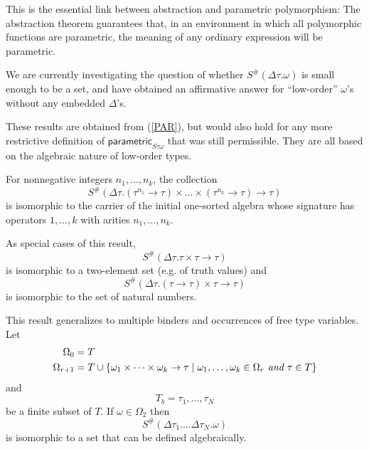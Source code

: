 \documentclass[sigplan,screen,nonacm,balance=false]{acmart}
\makeatletter
\theoremstyle{plain}
\DeclarePairedDelimiter{\set}{\{}{\}}
\newcommand{\eg}{e.g.\@\xspace}
\newcommand{\para}{\mathsf{parametric}}
\makeatother
\begin{document}
This is the essential link between abstraction and parametric polymorphism:
The abstraction theorem guarantees that, in an environment in which all polymorphic functions are parametric, the meaning of any ordinary expression will be parametric.

We are currently investigating the question of whether $S^\#(\Delta \tau. \omega)$ is small enough to be a set, and have obtained an affirmative answer for ``low-order'' $\omega$'s without any embedded $\Delta$'s.

These results are obtained from (\ref{PAR}), but would also hold for any more restrictive definition of $\para_{S \tau \omega}$ that was still permissible.
They are all based on the algebraic nature of low-order types.

For nonnegative integers $n_1, \dots, n_k$, the collection
%
\begin{equation*}
  S^\#(\Delta \tau. (\tau^{n_1} \to \tau) \times \dots \times (\tau^{n_k} \to \tau) \to \tau)
\end{equation*}
%
is isomorphic to the carrier of the initial one-sorted algebra whose signature has operators $1, \dots, k$ with arities $n_1, \dots, n_k$.

As special cases of this result,
%
\begin{equation*}
  S^\#(\Delta \tau. \tau \times \tau \to \tau)
\end{equation*}
%
is isomorphic to a two-element set (\eg of truth values) and
%
\begin{equation*}
  S^\#(\Delta \tau. (\tau \to \tau) \times \tau \to \tau)
\end{equation*}
%
is isomorphic to the set of natural numbers.

This result generalizes to multiple binders and occurrences of free type variables.
Let
%
\begin{align*}
  \Omega_0 &= T \\
  \Omega_{r + 1} &= T \cup \set{\omega_1 \times \dots \times \omega_k \to \tau \mid \omega_1, \dots, \omega_k \in \Omega_r \textit{ and } \tau \in T}
\end{align*}
%
and
%
\begin{equation*}
  T_b = {\tau_1, \dots, \tau_N}
\end{equation*}
%
be a finite subset of $T$.
If $\omega \in \Omega_2$ then
%
\begin{equation*}
  S^\#(\Delta \tau_1. \dots \Delta \tau_N. \omega)
\end{equation*}
%
is isomorphic to a set that can be defined algebraically.
\end{document}

